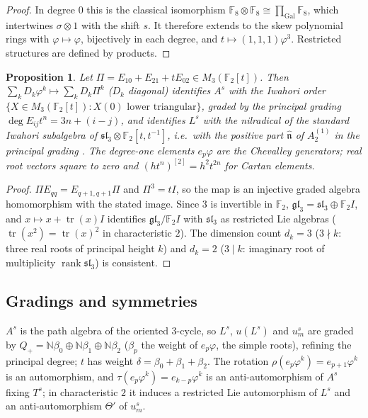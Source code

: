 \documentclass[11pt]{amsart}
\newtheorem{proposition}[theorem]{Proposition}
\theoremstyle{definition}
\newcommand{\F}{\mathbb{F}}
\newcommand{\N}{\mathbb{N}}
\newcommand{\hatn}{\widehat{\mathfrak n}}
\begin{document}
\begin{proof}
In degree $0$ this is the classical isomorphism $\F_8\otimes\F_8\cong\prod_{\mathrm{Gal}}\F_8$, which intertwines
$\sigma\otimes1$ with the shift $s$. It therefore extends to the skew polynomial rings with $\varphi\mapsto\varphi$,
bijectively in each degree, and $t\mapsto(1,1,1)\varphi^3$. Restricted structures are defined by products.
\end{proof}

\begin{proposition}\label{prop:affine}
Let $\Pi=E_{10}+E_{21}+tE_{02}\in M_3(\F_2[t])$. Then $\sum_kD_k\varphi^k\mapsto\sum_kD_k\Pi^k$ ($D_k$ diagonal)
identifies $A^s$ with the Iwahori order $\{X\in M_3(\F_2[t]):X(0)\text{ lower triangular}\}$, graded by the principal
grading $\deg E_{ij}t^n=3n+(i-j)$, and identifies $L^s$ with the nilradical of the standard Iwahori subalgebra of
$\mathfrak{sl}_3\otimes\F_2[t,t^{-1}]$, i.e.\ with the positive part $\hatn$ of $A_2^{(1)}$ in the principal grading
\cite[Ch.~7 and~14]{Kac}.
The degree-one elements $e_p\varphi$ are the Chevalley generators; real root vectors square to zero and
$(ht^n)^{[2]}=h^2t^{2n}$ for Cartan elements.
\end{proposition}

\begin{proof}
$\Pi E_{qq}=E_{q+1,q+1}\Pi$ and $\Pi^3=tI$, so the map is an injective graded algebra homomorphism with the stated
image. Since $3$ is invertible in $\F_2$, $\mathfrak{gl}_3=\mathfrak{sl}_3\oplus\F_2I$, and $x\mapsto x+\operatorname{tr}(x)I$
identifies $\mathfrak{gl}_3/\F_2I$ with $\mathfrak{sl}_3$ as restricted Lie algebras ($\operatorname{tr}(x^2)=\operatorname{tr}(x)^2$
in characteristic $2$). The dimension count $d_k=3$ ($3\nmid k$: three real roots of principal height $k$) and
$d_k=2$ ($3\mid k$: imaginary root of multiplicity $\operatorname{rank}\mathfrak{sl}_3$) is consistent.
\end{proof}

\subsection{Gradings and symmetries}
$A^s$ is the path algebra of the oriented $3$-cycle, so $L^s$, $u(L^s)$ and $u^s_m$ are graded by
$Q_+=\N\beta_0\oplus\N\beta_1\oplus\N\beta_2$ ($\beta_p$ the weight of $e_p\varphi$, the simple roots), refining the
principal degree; $t$ has weight $\delta=\beta_0+\beta_1+\beta_2$. The rotation $\rho(e_p\varphi^k)=e_{p+1}\varphi^k$
is an automorphism, and $\tau(e_p\varphi^k)=e_{k-p}\varphi^k$ is an anti-automorphism of $A^s$ fixing $T^s$; in
characteristic $2$ it induces a restricted Lie automorphism of $L^s$ and an anti-automorphism $\Theta'$ of $u^s_m$.
\end{document}
